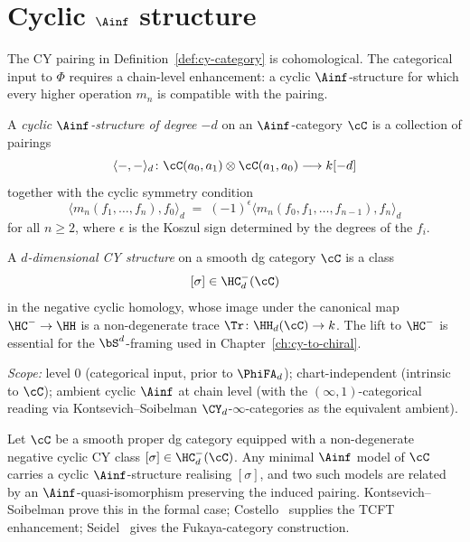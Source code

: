 \section{Cyclic \texorpdfstring{$\Ainf$}{A-inf} structure}
\label{sec:cyclic-ainf-cy}

The CY pairing in Definition~\ref{def:cy-category} is cohomological. The categorical input to $\Phi$ requires a chain-level enhancement: a cyclic $\Ainf$-structure for which every higher operation $m_n$ is compatible with the pairing.

\begin{definition}
\label{def:cyclic-ainf-cat}
A \emph{cyclic $\Ainf$-structure of degree $-d$} on an $\Ainf$-category $\cC$ is a collection of pairings
\[
 \langle -, - \rangle_d \colon \cC(a_0, a_1) \otimes \cC(a_1, a_0) \longrightarrow k[-d]
\]
together with the cyclic symmetry condition
\[
 \langle m_n(f_1, \ldots, f_n), f_0 \rangle_d \;=\; (-1)^{\epsilon} \langle m_n(f_0, f_1, \ldots, f_{n-1}), f_n \rangle_d
\]
for all $n \geq 2$, where $\epsilon$ is the Koszul sign determined by the degrees of the $f_i$.
\end{definition}

\begin{definition}
\label{def:negcyc-cy}
A \emph{$d$-dimensional CY structure} on a smooth dg category $\cC$ is a class
\[
 [\sigma] \in \HC^-_{d}(\cC)
\]
in the negative cyclic homology, whose image under the canonical map $\HC^- \to \HH$ is a non-degenerate trace $\Tr \colon \HH_d(\cC) \to k$. The lift to $\HC^-$ is essential for the $\bS^d$-framing used in Chapter~\ref{ch:cy-to-chiral}.
\end{definition}

\begin{theorem}
\label{thm:cyclic-ainf-enhancement}
\textsl{Scope:} level $0$ (categorical input, prior to $\PhiFA_d$);
chart-independent (intrinsic to $\cC$); ambient cyclic $\Ainf$ at
chain level (with the $(\infty, 1)$-categorical reading via
Kontsevich--Soibelman $\CY_d$-$\infty$-categories as the equivalent
ambient).

Let $\cC$ be a smooth proper dg category equipped with a non-degenerate negative cyclic CY class $[\sigma] \in \HC^-_d(\cC)$. Any minimal $\Ainf$ model of $\cC$ carries a cyclic $\Ainf$-structure realising $[\sigma]$, and two such models are related by an $\Ainf$-quasi-isomorphism preserving the induced pairing. Kontsevich--Soibelman prove this in the formal case; Costello~\cite{Costello2005} supplies the TCFT enhancement; Seidel~\cite{Seidel2008} gives the Fukaya-category construction.
\end{theorem}

